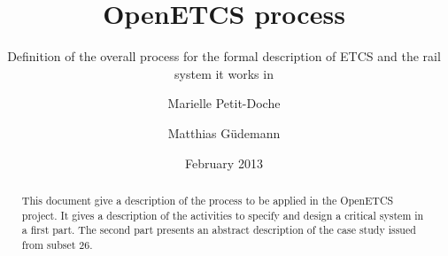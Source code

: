 \documentclass{template/openetcs_article}
\begin{document}
\frontmatter
{}




\title{OpenETCS process}

\subtitle{Definition of the overall process for the formal description of ETCS and the rail system it works in}

\date{February 2013}


\author{Marielle Petit-Doche}
  
\author{Matthias Güdemann}
  



\begin{abstract}
This document give a description of the process to be applied in the OpenETCS project. It gives a description of the activities to specify and design a critical system in a first part. The second part presents an abstract description of the case study issued from subset 26.
\end{abstract}

\maketitle
\tableofcontents
\listoffiguresandtables
\newpage



\newcommand{\tbd}{\colorbox{cyan}{\%\%To Be Defined\%\%}}
\newcommand{\tbc}{\colorbox{cyan}{\%\%To Be Confirmed\%\%}}
\newcommand{\todo}[1]{\colorbox{cyan}{\%\%{#1}\%\%}}
\newlength{\origindent}
\end{document}
